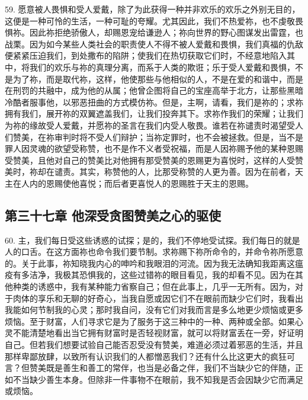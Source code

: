 59. 愿意被人畏惧和受人爱戴，除了为此获得一种并非欢乐的欢乐之外别无目的，这便是一种可怜的生活，一种可耻的夸耀。尤其因此，我们不热爱祢，也不虔敬畏惧祢。因此祢拒绝骄傲人，却赐恩宠给谦逊人；祢向世界的野心图谋发出雷霆，也战栗。因为如今某些人类社会的职责使人不得不被人爱戴和畏惧，我们真福的仇敌便紧紧压迫我们，到处撒布的陷阱；使我们在热切获取它们时，不经意地陷入其中，将我们的欢乐与祢的真理分离，而系于人类的欺诳；乐于受人爱戴和畏惧，不是为了祢，而是取代祢，这样，他使那些与他相似的人，不是在爱的和谐中，而是在刑罚的共融中，成为他的从属；他曾企图将自己的宝座高举于北方，让那些黑暗冷酷者服事他，以邪恶扭曲的方式模仿祢。但是，主啊，请看，我们是祢的；求祢拥有我们，展开祢的双翼遮盖我们，让我们投奔其下。求祢作我们的荣耀；让我们为祢的缘故受人爱戴，并愿祢的圣言在我们内受人敬畏。谁若在祢谴责时渴望受人们赞美，在祢审判时将不受人们辩护；当祢定罪时，也不会被拯救。但是，当不是罪人因灵魂的欲望受称赞，也不是作不义者受祝福，而是人因祢赐予他的某种恩赐受赞美，且他对自己的赞美比对他拥有那受赞美的恩赐更为喜悦时，这样的人受赞美时，祢却在谴责。其实，称赞他的人，比那受称赞的人更为善。因为在前者，天主在人内的恩赐使他喜悦；而后者更喜悦人的恩赐胜于天主的恩赐。\par


\subsection{第三十七章 他深受贪图赞美之心的驱使}

60. 主，我们每日受这些诱惑的试探；是的，我们不停地受试探。我们每日的就是人的口舌。在这方面祢也命令我们要节制。求祢赐下祢所命令的，并命令祢所愿意的。关于此事，祢知晓我内心的呻吟和我眼泪的河流。因为我无法确知我距离这瘟疫有多洁净，我极其恐惧我的，这些过错祢的眼目看见，我的却看不见。因为在其他种类的诱惑中，我有某种能力省察自己；但在此事上，几乎一无所有。因为，对于肉体的享乐和无聊的好奇心，当我自愿或因它们不在眼前而缺少它们时，我看出我能如何节制我的心灵；那时我自问，没有它们对我而言是多么地更少烦恼或更多烦恼。至于财富，人们寻求它是为了服务于这三种中的一种、两种或全部。如果心灵不能清楚地看出当它拥有财富时是否轻视财富，就可以将财富丢在一旁，好证明自己。但若我们想要试验自己能否忍受没有赞美，难道必须过着邪恶的生活，并且那样卑鄙放肆，以致所有认识我们的人都憎恶我们？还有什么比这更大的疯狂可言？但赞美既是善生和善工的常伴，也当是必备之伴，我们不当缺少它的伴随，正如不当缺少善生本身。但除非一件事物不在眼前，我不知我是否会因缺少它而满足或烦恼。\par

